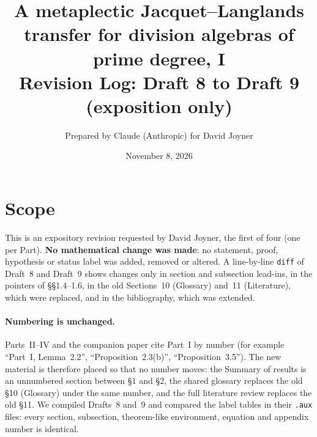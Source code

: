 \documentclass[11pt]{article}
\title{A metaplectic Jacquet--Langlands transfer for division algebras of prime degree, I\\
Revision Log: Draft 8 to Draft 9 (exposition only)}
\author{Prepared by Claude (Anthropic) for David Joyner}
\date{November 8, 2026}
\begin{document}
\maketitle

\section*{Scope}
This is an expository revision requested by David Joyner, the first of
four (one per Part).  \textbf{No mathematical change was made}: no
statement, proof, hypothesis or status label was added, removed or
altered.  A line-by-line \texttt{diff} of Draft~8 and Draft~9 shows
changes only in section and subsection lead-ins, in the pointers of
\S\S1.4--1.6, in the old Sections~10 (Glossary) and~11 (Literature),
which were replaced, and in the bibliography, which was extended.

\paragraph{Numbering is unchanged.}  Parts~II--IV and the companion
paper cite Part~I by number (for example ``Part~I, Lemma~2.2'',
``Proposition~2.3(b)'', ``Proposition~3.5'').  The new material is
therefore placed so that no number moves: the Summary of results is an
unnumbered section between \S1 and \S2, the shared glossary replaces
the old \S10 (Glossary) under the same number, and the full literature
review replaces the old \S11.  We compiled Drafts~8 and~9 and compared
the label tables in their \texttt{.aux} files: every section,
subsection, theorem-like environment, equation and appendix number is
identical.
\end{document}
